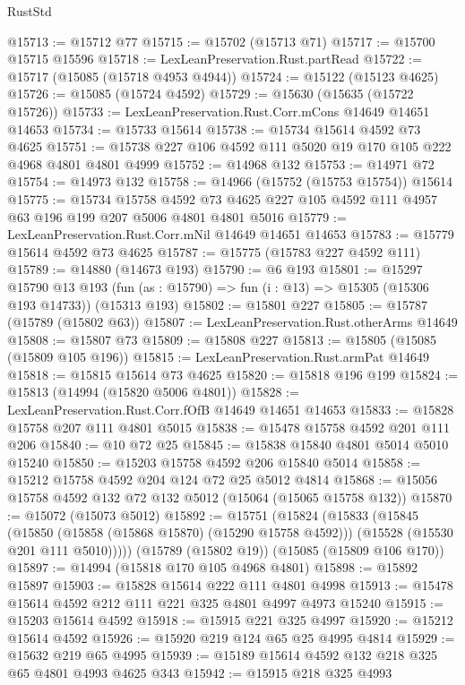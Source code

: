 \begin{lexlean}{RustStd}
\begin{coremodule}
@15713 := @15712 @77
@15715 := @15702 (@15713 @71)
@15717 := @15700 @15715 @15596
@15718 := LexLeanPreservation.Rust.partRead
@15722 := @15717 (@15085 (@15718 @4953 @4944))
@15724 := @15122 (@15123 @4625)
@15726 := @15085 (@15724 @4592)
@15729 := @15630 (@15635 (@15722 @15726))
@15733 := LexLeanPreservation.Rust.Corr.mCons @14649 @14651 @14653
@15734 := @15733 @15614
@15738 := @15734 @15614 @4592 @73 @4625
@15751 := @15738 @227 @106 @4592 @111 @5020 @19 @170 @105 @222 @4968 @4801 @4801 @4999
@15752 := @14968 @132
@15753 := @14971 @72
@15754 := @14973 @132
@15758 := @14966 (@15752 (@15753 @15754)) @15614
@15775 := @15734
    @15758
    @4592
    @73
    @4625
    @227
    @105
    @4592
    @111
    @4957
    @63
    @196
    @199
    @207
    @5006
    @4801
    @4801
    @5016
@15779 := LexLeanPreservation.Rust.Corr.mNil @14649 @14651 @14653
@15783 := @15779 @15614 @4592 @73 @4625
@15787 := @15775 (@15783 @227 @4592 @111)
@15789 := @14880 (@14673 @193)
@15790 := @6 @193
@15801 := @15297
    @15790
    @13
    @193
    (fun (as : @15790) => fun (i : @13) => @15305 (@15306 @193 @14733))
    (@15313 @193)
@15802 := @15801 @227
@15805 := @15787 (@15789 (@15802 @63))
@15807 := LexLeanPreservation.Rust.otherArms @14649
@15808 := @15807 @73
@15809 := @15808 @227
@15813 := @15805 (@15085 (@15809 @105 @196))
@15815 := LexLeanPreservation.Rust.armPat @14649
@15818 := @15815 @15614 @73 @4625
@15820 := @15818 @196 @199
@15824 := @15813 (@14994 (@15820 @5006 @4801))
@15828 := LexLeanPreservation.Rust.Corr.fOfB @14649 @14651 @14653
@15833 := @15828 @15758 @207 @111 @4801 @5015
@15838 := @15478 @15758 @4592 @201 @111 @206
@15840 := @10 @72 @25
@15845 := @15838 @15840 @4801 @5014 @5010 @15240
@15850 := @15203 @15758 @4592 @206 @15840 @5014
@15858 := @15212 @15758 @4592 @204 @124 @72 @25 @5012 @4814
@15868 := @15056 @15758 @4592 @132 @72 @132 @5012 (@15064 (@15065 @15758 @132))
@15870 := @15072 (@15073 @5012)
@15892 := @15751
    (@15824
      (@15833
        (@15845
          (@15850 (@15858 (@15868 @15870) (@15290 @15758 @4592)))
          (@15528 (@15530 @201 @111 @5010)))))
    (@15789 (@15802 @19))
    (@15085 (@15809 @106 @170))
@15897 := @14994 (@15818 @170 @105 @4968 @4801)
@15898 := @15892 @15897
@15903 := @15828 @15614 @222 @111 @4801 @4998
@15913 := @15478 @15614 @4592 @212 @111 @221 @325 @4801 @4997 @4973 @15240
@15915 := @15203 @15614 @4592
@15918 := @15915 @221 @325 @4997
@15920 := @15212 @15614 @4592
@15926 := @15920 @219 @124 @65 @25 @4995 @4814
@15929 := @15632 @219 @65 @4995
@15939 := @15189 @15614 @4592 @132 @218 @325 @65 @4801 @4993 @4625 @343
@15942 := @15915 @218 @325 @4993

\end{coremodule}
\end{lexlean}
